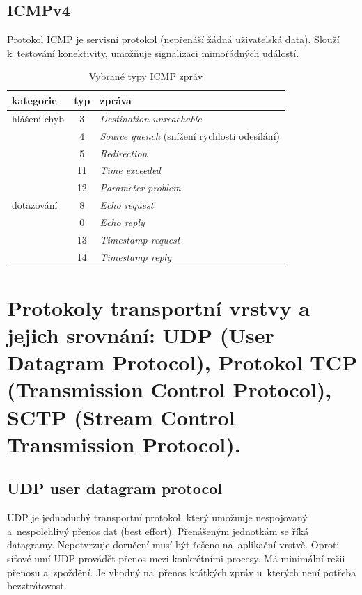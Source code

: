 \subsection{ICMPv4}

Protokol ICMP je servisní protokol (nepřenáší žádná uživatelská data). Slouží k~testování konektivity, umožňuje signalizaci mimořádných událostí.

\begin{table}[ht]
	\centering
	\caption{Vybrané typy ICMP zpráv}
	\begin{tabular}{|l|c|l|}
		\hline
		kategorie    & typ & zpráva \\\hline\hline
		hlášení chyb & 3   & \emph{Destination unreachable} \\
		             & 4   & \emph{Source quench} (snížení rychlosti odesílání) \\
		             & 5   & \emph{Redirection} \\
		             & 11  & \emph{Time exceeded} \\
		             & 12  & \emph{Parameter problem} \\
		\hline
		dotazování   & 8   & \emph{Echo request} \\
		             & 0   & \emph{Echo reply} \\
		             & 13  & \emph{Timestamp request} \\
		             & 14  & \emph{Timestamp reply} \\
		\hline
	\end{tabular}
\end{table}



\clearpage
\section{Protokoly transportní vrstvy a jejich srovnání: UDP (User Datagram Protocol), Protokol TCP (Transmission Control Protocol), SCTP (Stream Control Transmission Protocol).}

\subsection{UDP user datagram protocol}

UDP je jednoduchý transportní protokol, který umožnuje nespojovaný a~nespolehlivý přenos dat (best effort). Přenášeným jednotkám se říká datagramy. Nepotvrzuje doručení musí být řešeno na~aplikační vrstvě. Oproti síťové umí UDP provádět přenos mezi konkrétními procesy. Má minimální režii přenosu a~zpoždění. Je vhodný na~přenos krátkých zpráv u~kterých není potřeba bezztrátovost.

